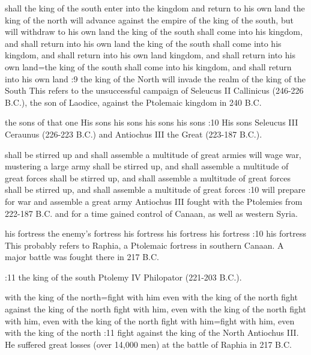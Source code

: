     {shall the king of the south enter into the kingdom and return to his own land} %
    {the king of the north will advance against the empire of the king of the south, but will withdraw to his own land} %
    {the king of the south shall come into his kingdom, and shall return into his own land} %
    {the king of the south shall come into his kingdom, and shall return into his own land} %
    {kingdom, and shall return into his own land}={the king of the south shall come into his kingdom, and shall return into his own land} %
:9 {the king of the North will invade the realm of the king of the South} This refers to the unsuccessful campaign of Seleucus II Callinicus (246-226 B.C.), the son of Laodice, against the  Ptolemaic kingdom in 240 B.C.

    {the sons of that one} %
    {His sons} %
    {his sons} %
    {his sons} %
    {his sons} %
:10 {His sons} Seleucus III Ceraunus (226-223 B.C.) and Antiochus III the Great (223-187 B.C.). 

    {shall be stirred up and shall assemble a multitude of great armies} %
    {will wage war, mustering a large army} %
    {shall be stirred up, and shall assemble a multitude of great forces} %
    {shall be stirred up, and shall assemble a multitude of great forces} %
    {shall be stirred up, and shall assemble a multitude of great forces} %
:10 {will prepare for war and assemble a great army} Antiochus III fought with the Ptolemies from 222-187 B.C. and for a time gained control of Canaan, as well as western Syria.

    {his fortress} %
    {the enemy's fortress} %
    {his fortress} %
    {his fortress} %
    {his fortress} %
:10 {his fortress} This probably refers to Raphia, a Ptolemaic fortress in southern Canaan. A major battle was fought  there in 217 B.C.

:11 {the king of the south} Ptolemy IV Philopator (221-203 B.C.). 

    {with the king of the north}={fight with him even with the king of the north} %
    {fight against the king of the north} %
    {fight with him, even with the king of the north} %
    {fight with him, even with the king of the north} %
    {fight with him}={fight with him, even with the king of the north} %
:11 {fight against the king of the North} Antiochus III. He suffered great losses (over 14,000 men) at the battle of Raphia in 217 B.C. 

